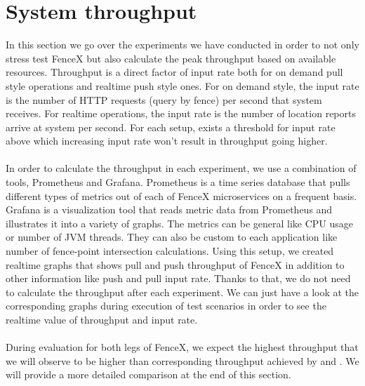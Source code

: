 \documentclass[a4]{report}
\begin{document}
    \section{System throughput}
    In this section we go over the experiments we have conducted in order to not only stress test FenceX but also
    calculate the peak throughput based on available resources.
    Throughput is a direct factor of input rate both for on demand pull style operations and realtime push style ones.
    For on demand style, the input rate is the number of HTTP requests (query by fence) per second that system receives.
    For realtime operations, the input rate is the number of location reports arrive at system per second.
    For each setup, exists a threshold for input rate above which increasing input rate won't result in throughput going higher.

    \paragraph{}
    In order to calculate the throughput in each experiment, we use a combination of tools, Prometheus and
    Grafana\cite{grafana}.
    Prometheus is a time series database that pulls different types of metrics out of each of FenceX microservices on
    a frequent basis.
    Grafana is a visualization tool that reads metric data from Prometheus and illustrates it into a variety of graphs.
    The metrics can be general like CPU usage or number of JVM threads.
    They can also be custom to each application like number of fence-point intersection calculations.
    Using this setup, we created realtime graphs that shows pull and push throughput of FenceX in addition to other
    information like push and pull input rate.
    Thanks to that, we do not need to calculate the throughput after each experiment.
    We can just have a look at the corresponding graphs during execution of test scenarios in order to see the realtime
    value of throughput and input rate.

    \paragraph{}
    During evaluation for both legs of FenceX, we expect the highest throughput that we will observe to be higher
    than corresponding throughput achieved by \cite{Nechifor_Comnac_2013} and
    \cite{Cirillo-Jacobs-Martin-Szczytowski-2014}.
    We will provide a more detailed comparison at the end of this section.
\end{document}
